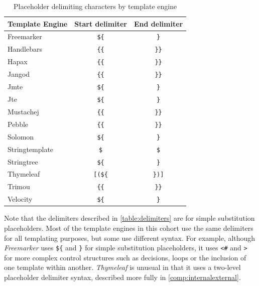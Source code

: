 \begin{table}[ht!]
\centering
\begin{tabular}{lcc}
\textbf{Template Engine} & \textbf{Start delimiter} & \textbf{End delimiter} \\
\hline
Freemarker               & \verb!${!                     & \verb!}! \\
Handlebars               & \verb!{{!                     & \verb!}}! \\
Hapax                    & \verb!{{!                     & \verb!}}! \\
Jangod                   & \verb!{{!                     & \verb!}}! \\
Jmte                     & \verb!${!                     & \verb!}! \\
Jte                      & \verb!${!                     & \verb!}! \\
Mustachej                & \verb!{{!                     & \verb!}}! \\
Pebble                   & \verb!{{!                     & \verb!}}! \\
Solomon                  & \verb!${!                     & \verb!}! \\
Stringtemplate           & \verb!$!                      & \verb!$! \\
Stringtree               & \verb!${!                     & \verb!}! \\
Thymeleaf                & \verb![(${!                   & \verb!})]! \\
Trimou                   & \verb!{{!                     & \verb!}}! \\
Velocity                 & \verb!${!                     & \verb!}! \\
\end{tabular}
\caption{Placeholder delimiting characters by \gls{template engine}\label{table:delimiters}}
\end{table}

Note that the delimiters described in \autoref{table:delimiters} are for simple substitution placeholders. Most of the \gls{template engine}s in this cohort use the same delimiters for all templating purposes, but some use different syntax. For example, although \emph{Freemarker} uses \verb!${! and \verb!}! for simple substitution placeholders, it uses \verb!<#! and \verb!>! for more complex control structures such as decisions, loops or the inclusion of one template within another. \emph{Thymeleaf} is unusual in that it uses a two-level placeholder delimiter syntax, described more fully in \autoref{comp:internalexternal}.

